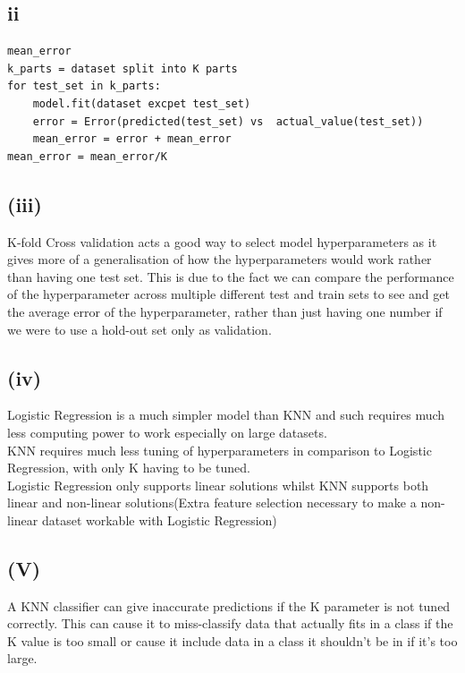 \documentclass[11pt]{article} %
\begin{document}
\subsection{{ii}}
\begin{verbatim}
mean_error 
k_parts = dataset split into K parts
for test_set in k_parts:
    model.fit(dataset excpet test_set)
    error = Error(predicted(test_set) vs  actual_value(test_set))
    mean_error = error + mean_error
mean_error = mean_error/K
\end{verbatim}
\subsection{(iii)}
K-fold Cross validation acts a good way to select model hyperparameters as it gives more of a generalisation of how the hyperparameters would work rather than having one test set.  This is due to the fact we can compare the performance of the hyperparameter across multiple different test and train sets to see and get the average error of the hyperparameter,  rather than just having one number if we were to use a hold-out set only as validation. 
\subsection{(iv)}
Logistic Regression is a much simpler model than KNN and such requires much less computing power to work especially on large datasets.
\\ KNN requires much less tuning of hyperparameters in comparison to Logistic Regression,  with only K having to be tuned.
\\ Logistic Regression only supports linear solutions whilst KNN supports both linear and non-linear solutions(Extra feature selection necessary to make a non-linear dataset workable with Logistic Regression)
\subsection{(V)}
A KNN classifier can give inaccurate predictions if the K parameter is not tuned correctly.  This can cause it to miss-classify data that actually fits in a class if the K value is too small or cause it include data in a class it shouldn't be in if it's too large.
\end{document}
